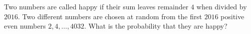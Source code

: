 Two numbers are called happy if their sum leaves remainder $4$ when divided by $2016$. Two different numbers are chosen at random from the first $2016$ positive even numbers $2,4,\dots,4032$. What is the probability that they are happy?
